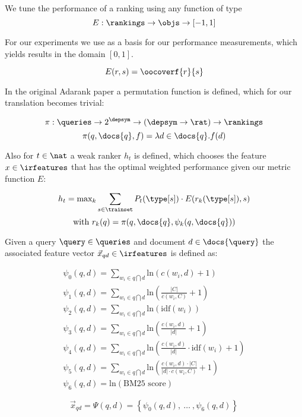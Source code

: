 \begin{definition}
  We tune the performance of a ranking using any function of type
  \[
    E :
      \rankings \rightarrow \objs \rightarrow [ -1, 1 ]
  \]

  For our experiments we use \oocover as a basis for our performance measurements,
  which yields results in the domain $[ 0, 1 ]$.

  \[
    E(r, s) = \oocoverf{r}{s}
  \]
\end{definition}

\begin{definition}
  In the original Adarank paper \cite{xu2007adarank} a permutation function is defined, which for
  our translation becomes trivial:

  \[ \pi : \queries \rightarrow 2^\depsym \rightarrow (\depsym \rightarrow \rat) \rightarrow \rankings \]
  \[ \pi(q, \docs{q}, f) = \lambda d \in \docs{q} . f(d) \]
\end{definition}

\begin{definition}
  Also for $t \in \nat$ a weak ranker $h_t$ is defined, which chooses the feature $x \in \irfeatures$
  that has the optimal weighted performance given our metric function $E$:

  \[
    h_t = \text{max}_k \sum_{s \in \trainset}
      P_t(\type[s]) \cdot E(r_k(\type[s]), s)
  \]
  \[
    \text{with}~ r_k(q) = \pi(q, \docs{q}, \psi_k(q, \docs{q}))
  \]
\end{definition}

\begin{definition}
  Given a query $\query \in \queries$ and document $d \in \docs{\query}$ the
  associated feature vector ${\vec{x}}_{q d} \in \irfeatures$ is defined as:

  \[
  \begin{array}{l}
    \psi_0(q, d) = \sum_{w_i \in q \bigcap d} \text{ln}(c(w_i, d) + 1) \\
    \psi_1(q, d) = \sum_{w_i \in q \bigcap d} \text{ln}(\frac{|C|}{c(w_i, C)} + 1) \\
    \psi_2(q, d) = \sum_{w_i \in q \bigcap d} \text{ln}(\text{idf}(w_i)) \\
    \psi_3(q, d) = \sum_{w_i \in q \bigcap d} \text{ln}(\frac{c(w_i, d)}{|d|} + 1) \\
    \psi_4(q, d) = \sum_{w_i \in q \bigcap d} \text{ln}(\frac{c(w_i, d)}{|d|} \cdot \text{idf}(w_i) + 1) \\
    \psi_5(q, d) = \sum_{w_i \in q \bigcap d} \text{ln}(\frac{c(w_i, d) \cdot |C|}{|d| \cdot c(w_i, C)} + 1) \\
    \psi_6(q, d) = \text{ln}( \text{BM25 score} )
  \end{array}
  \]

  \[
    {\vec{x}}_{q d} = \Psi(q, d) = \left\{ \psi_0(q, d), ~\ldots~, \psi_6(q, d) \right\}
  \]
\end{definition}

